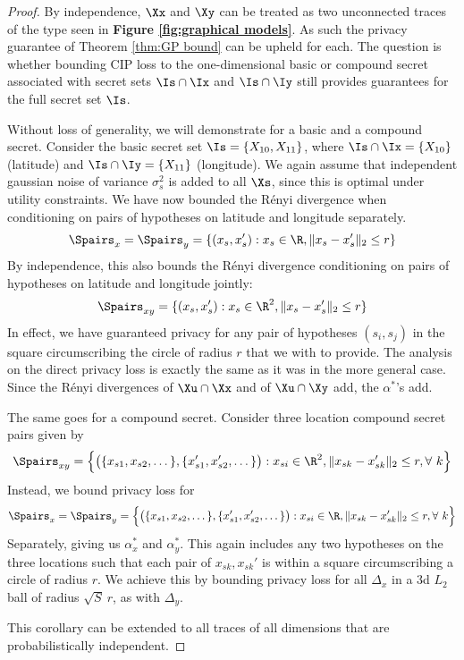 \begin{proof}
	By independence, $\Xx$ and $\Xy$ can be treated as two unconnected traces of the type seen in \textbf{Figure \ref{fig:graphical models}}. As such the privacy guarantee of Theorem \ref{thm:GP bound} can be upheld for each. The question is whether bounding CIP loss to the one-dimensional basic or compound secret associated with secret sets $\Is \cap \Ix$ and $\Is \cap \Iy$ still provides guarantees for the full secret set $\Is$. 
	
	Without loss of generality, we will demonstrate for a basic and a compound secret. Consider the basic secret set $\Is = \{X_{10}, X_{11}\}$, where $\Is \cap \Ix = \{X_{10}\}$ (latitude) and $\Is \cap \Iy = \{X_{11}\}$ (longitude). We again assume that independent gaussian noise of variance $\sigma_s^2$ is added to all $\Xs$, since this is optimal under utility constraints. We have now bounded the R\'enyi divergence when conditioning on pairs of hypotheses on latitude and longitude separately. 
	\begin{align*} 
	{\Spairs}_x = {\Spairs}_y = \{(x_s, x_s'):x_s \in \R,  \|x_s - x_s'\|_2 \leq r\}
	\end{align*}
	By independence, this also bounds the R\'enyi divergence conditioning on pairs of hypotheses on latitude and longitude jointly: 
	\begin{align*} 
	{\Spairs}_{xy} = \{(x_s, x_s'):x_s \in \R^2,  \|x_s - x_s'\|_2 \leq r\}
	\end{align*}
	In effect, we have guaranteed privacy for any pair of hypotheses $(s_i, s_j)$ in the square circumscribing the circle of radius $r$ that we with to provide. The analysis on the direct privacy loss is exactly the same as it was in the more general case. Since the R\'enyi divergences of $\Xu \cap \Xx$ and of $\Xu \cap \Xy$ add, the $\alpha^*$'s add. 
	
	The same goes for a compound secret. Consider three location compound secret pairs given by 
	\begin{align*}
		{\Spairs}_{xy} = \Big\{\big( \{x_{s1}, x_{s2}, \dots\}, \{x_{s1}', x_{s2}', \dots\}\big): x_{si} \in \R^2, \| x_{sk} - x_{sk}' \|_2 \leq r, \forall \ k\Big\} 
	\end{align*} 
	Instead, we bound privacy loss for 
	\begin{align*}
		{\Spairs}_x = {\Spairs}_y = \Big\{\big( \{x_{s1}, x_{s2}, \dots\}, \{x_{s1}', x_{s2}', \dots\} \big): x_{si} \in \R, \| x_{sk} - x_{sk}' \|_2 \leq r, \forall \ k \Big\}
	\end{align*}
	Separately, giving us $\alpha_x^*$ and $\alpha_y^*$. This again includes any two hypotheses on the three locations such that each pair of $x_{sk}, x_{sk}'$ is within a square circumscribing a circle of radius $r$. We achieve this by bounding privacy loss for all $\Delta_x$ in a 3d $L_2$ ball of radius $\sqrt{S}  \ r$, as with $\Delta_y$. 
	
	This corollary can be extended to all traces of all dimensions that are probabilistically independent. 
\end{proof}


